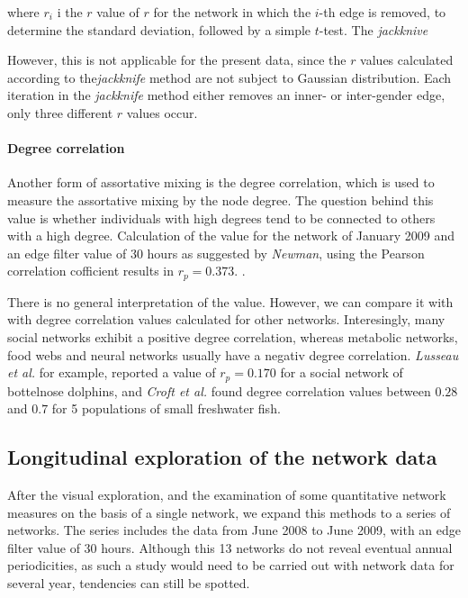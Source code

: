 where $r_i$ i the $r$ value of $r$ for the network in which the $i$-th edge is removed, to determine the standard deviation, followed by a simple $t$-test\cite{snijders:99}. The \textit{jackknive}

However, this is not applicable for the present data, since the $r$ values calculated according to the\textit{jackknife} method are not subject to Gaussian distribution. Each iteration in the \textit{jackknife} method either removes an inner- or inter-gender edge, only three different $r$ values occur.

\paragraph{Degree correlation}
\label{para:degree_corr}
 
Another form of assortative mixing is the degree correlation, which is used to measure the assortative mixing by the node degree. The question behind this value is whether individuals with high degrees tend to be connected to others with a high degree\cite{croft:07}. Calculation of the value for the network of January 2009 and an edge filter value of 30 hours as suggested by \textit{Newman}\cite{newman:02}, using the Pearson correlation cofficient results in $r_p = 0.373$. \cite{newman:03a}. 

There is no general interpretation of the value. However, we can compare it with with degree correlation values calculated for other networks. Interesingly, many social networks exhibit a positive degree correlation, whereas metabolic networks, food webs and neural networks usually have a negativ degree correlation\cite{newman:03a}. \textit{Lusseau et al.}\cite{lusseau:06} for example, reported a value of $r_p = 0.170$ for a social network of bottelnose dolphins, and \textit{Croft et al.}\cite{croft:05} found degree correlation values between $0.28$ and $0.7$ for 5 populations of small freshwater fish.   
 
\subsection{Longitudinal exploration of the network data}
\label{subsec:longitudinal}

After the visual exploration, and the examination of some quantitative network measures on the basis of a single network, we expand this methods to a series of networks. The series includes the data from June 2008 to June 2009, with an edge filter value of 30 hours. Although this 13 networks do not reveal eventual annual periodicities, as such a study would need to be carried out with network data for several year, tendencies can still be spotted.
 
